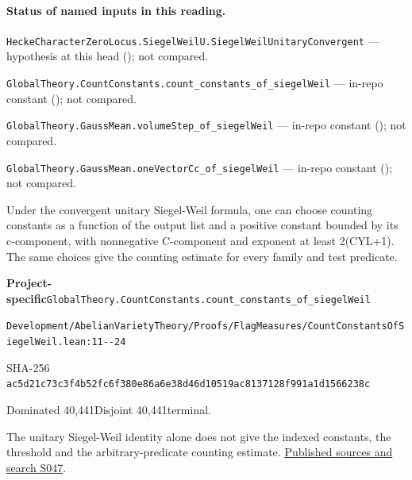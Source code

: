

\paragraph{Status of named inputs in this reading.}
\noindent\nolinkurl{HeckeCharacterZeroLocus.SiegelWeilU.SiegelWeilUnitaryConvergent} --- hypothesis at this head (); not compared.\par
\noindent\nolinkurl{GlobalTheory.CountConstants.count_constants_of_siegelWeil} --- in-repo constant (); not compared.\par
\noindent\nolinkurl{GlobalTheory.GaussMean.volumeStep_of_siegelWeil} --- in-repo constant (); not compared.\par
\noindent\nolinkurl{GlobalTheory.GaussMean.oneVectorCc_of_siegelWeil} --- in-repo constant (); not compared.\par

\begin{formalstatement}[D379]\label{decomp:D379}
Under the convergent unitary Siegel-Weil formula, one can choose counting constants as a function of the output list and a positive constant bounded by its c-component, with nonnegative C-component and exponent at least 2(CYL+1). The same choices give the counting estimate for every family and test predicate.
\end{formalstatement}
{\small\raggedright\noindent\textsf{\bfseries Project-specific}\quad \nolinkurl{GlobalTheory.CountConstants.count_constants_of_siegelWeil}\par\noindent \nolinkurl{Development/AbelianVarietyTheory/Proofs/FlagMeasures/CountConstantsOfSiegelWeil.lean:11--24}\par\noindent SHA-256 \nolinkurl{ac5d21c73c3f4b52fc6f380e86a6e38d46d10519ac8137128f991a1d1566238c}\par\noindent Dominated 40,441\quad Disjoint 40,441\quad terminal.\par}
The unitary Siegel-Weil identity alone does not give the indexed constants, the threshold and the arbitrary-predicate counting estimate.
\hyperref[lit:S047]{Published sources and search S047}.
